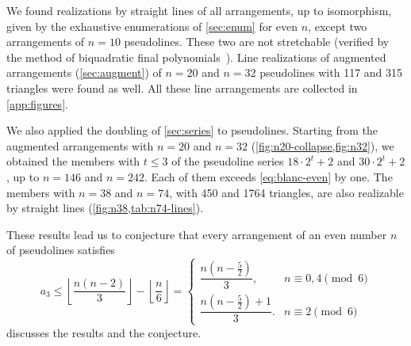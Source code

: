 We found realizations by straight lines of all arrangements, up to isomorphism, given by the exhaustive enumerations of \cref{sec:enum} for even $n$, except two arrangements of $n=10$ pseudolines. These two are not stretchable (verified by the method of biquadratic final polynomials~\cite{br90}). Line realizations of augmented arrangements (\cref{sec:augment}) of $n=20$ and $n=32$ pseudolines with 117 and 315 triangles were found as well. All these line arrangements are collected in \cref{app:figures}.

We also applied the doubling of \cref{sec:series} to pseudolines. Starting from the augmented arrangements with $n=20$ and $n=32$ (\cref{fig:n20-collapse,fig:n32}), we obtained the members with $t\le3$ of the pseudoline series $18\cdot2^t+2$ and $30\cdot2^t+2$, up to $n=146$ and $n=242$. Each of them exceeds \eqref{eq:blanc-even} by one. The members with $n=38$ and $n=74$, with 450 and 1764 triangles, are also realizable by straight lines (\cref{fig:n38,tab:n74-lines}).

These results lead us to conjecture that every arrangement of an even number $n$ of pseudolines satisfies
\begin{equation}\label{eq:conj-bound}
a_{3}\le\left\lfloor\dfrac{n(n - 2)}{3}\right\rfloor-\left\lfloor\dfrac{n}{6}\right\rfloor=\begin{cases}
\dfrac{n(n - \frac52)}{3}, & n\equiv0,4\pmod 6 \\
\dfrac{n(n - \frac52) + 1}{3}. &  n\equiv2\pmod 6
\end{cases}
\end{equation}
 discusses the results and the conjecture.
